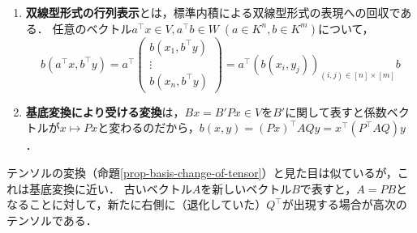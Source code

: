 \documentclass[uplatex, dvipdfmx]{jsreport}
\begin{document}
\begin{tcolorbox}[colframe=ForestGreen, colback=ForestGreen!10!white, breakable]

    \begin{enumerate}
        \item \textbf{双線型形式の行列表示}とは，標準内積による双線型形式の表現への回収である．
        任意のベクトル$a^\top x\in V,a^\top b\in W\;(a\in K^n,b\in K^m)$について，
        \[b(a^\top x,b^\top y)=a^\top\begin{pmatrix}
            b(x_1,b^\top y)\\\vdots\\b(x_n,b^\top y)
        \end{pmatrix}=a^\top (b(x_i,y_j))_{(i,j)\in[n]\times[m]}b\]
        \item \textbf{基底変換により受ける変換}は，$Bx=B'Px\in V$を$B'$に関して表すと係数ベクトルが$x\mapsto Px$と変わるのだから，$b(x,y)=(Px)^\top AQy=x^\top(P^\top AQ)y$．
    \end{enumerate}
    
    テンソルの変換（命題\ref{prop-basis-change-of-tensor}）と見た目は似ているが，これは基底変換に近い．
    古いベクトル$A$を新しいベクトル$B$で表すと，$A=PB$となることに対して，新たに右側に（退化していた）$Q^\top$が出現する場合が高次のテンソルである．
\end{tcolorbox}
\end{document}
